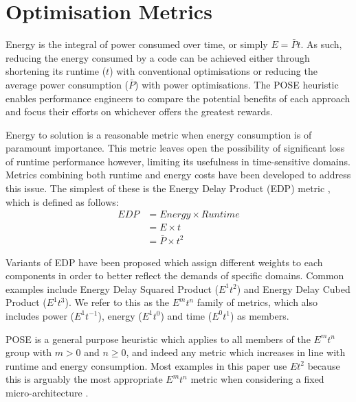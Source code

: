 \section{Optimisation Metrics}
\label{sec:metrics}

Energy is the integral of power consumed over time, or simply $E = \bar{P}t$.
As such, reducing the energy consumed by a code can be achieved either through shortening its runtime ($t$) with conventional optimisations or reducing the average power consumption ($\bar{P}$) with power optimisations.
The POSE heuristic enables performance engineers to compare the potential benefits of each approach and focus their efforts on whichever offers the greatest rewards.

Energy to solution is a reasonable metric when energy consumption is of paramount importance.
This metric leaves open the possibility of significant loss of runtime performance however, limiting its usefulness in time-sensitive domains.
Metrics combining both runtime and energy costs have been developed to address this issue. 
The simplest of these is the Energy Delay Product (EDP) metric \cite{gonzales:1995aa}, which is defined as follows:
\begin{align}
  EDP &= Energy \times Runtime \nonumber \\
      &= E \times t \nonumber \\
      &= \bar{P} \times t^2
  \label{eq:edp}
\end{align}

Variants of EDP have been proposed which assign different weights to each components in order to better reflect the demands of specific domains.
Common examples include Energy Delay Squared Product ($E^1t^{2}$) and Energy Delay Cubed Product ($E^1t^{3}$).
We refer to this as the $E^mt^n$ family of metrics, which also includes power ($E^1t^{-1}$), energy ($E^1t^0$) and time ($E^0t^1$) as members.

POSE is a general purpose heuristic which applies to all members of the $E^mt^n$ group with $m > 0$ and $n \geq 0$, and indeed any metric which increases in line with runtime and energy consumption.
Most examples in this paper use $Et^2$ because this is arguably the most appropriate $E^mt^n$ metric when considering a fixed micro-architecture \cite{brooks:2000aa}.
